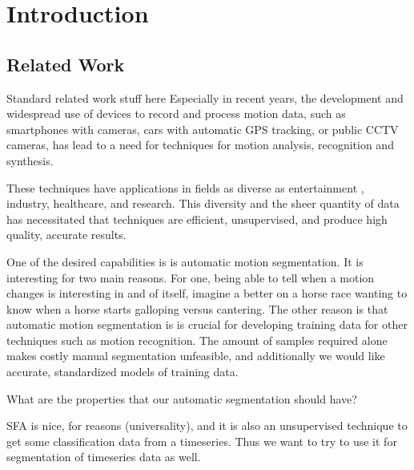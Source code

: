 \section{Introduction}

\subsection{Related Work}
Standard related work stuff here
Especially in recent years, the development and widespread use of devices to record and process motion data, such as smartphones with cameras, cars with automatic GPS tracking, or public CCTV cameras, has lead to a need for techniques for motion analysis, recognition and synthesis.

These techniques have applications in fields as diverse as entertainment , industry, healthcare, and research. This diversity and the sheer quantity of data has necessitated that techniques are efficient, unsupervised, and produce high quality, accurate results.

One of the desired capabilities is  is automatic motion segmentation. It is interesting for two main reasons. For one, being able to tell when a motion changes is interesting in and of itself, imagine a better on a horse race wanting to know when a horse starts galloping versus cantering. The other reason is that automatic motion segmentation is is crucial for developing training data for other techniques such as motion recognition. The amount of samples required alone makes costly manual segmentation unfeasible, and additionally we would like accurate, standardized models of training data.

What are the properties that our automatic segmentation should have? 



SFA is nice, for reasons (universality), and it is also an unsupervised technique to get some classification data from a timeseries. Thus we want to try to use it for segmentation of timeseries data as well.